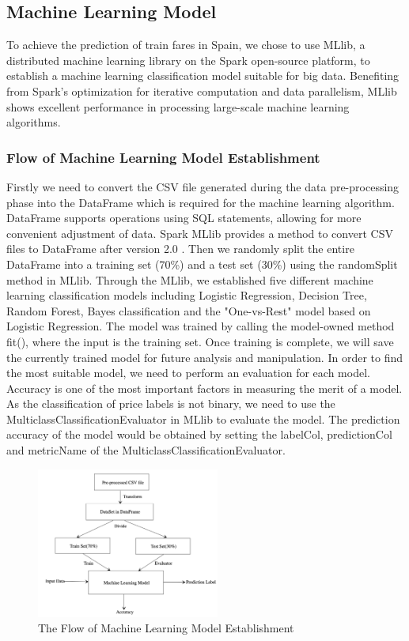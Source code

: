 \documentclass[conference]{IEEEtran}
\begin{document}
\subsection{Machine Learning Model}
To achieve the prediction of train fares in Spain, we chose to use MLlib, a distributed machine learning library on the Spark open-source platform, to establish a machine learning classification model suitable for big data. Benefiting from Spark's optimization for iterative computation and data parallelism, MLlib shows excellent performance in processing large-scale machine learning algorithms\cite{b25}. 
\subsubsection{Flow of Machine Learning Model Establishment}
Firstly we need to convert the CSV file generated during the data pre-processing phase into the DataFrame  which is required for the machine learning algorithm. DataFrame supports operations using SQL statements, allowing for more convenient adjustment of data. Spark MLlib provides a method to convert CSV files to DataFrame after version 2.0 \cite{b26}. Then we randomly split the entire DataFrame into a training set (70\%) and a test set (30\%) using the randomSplit method in MLlib. Through the MLlib, we established five different machine learning classification models including Logistic Regression, Decision Tree, Random Forest, Bayes classification and the "One-vs-Rest" model based on Logistic Regression. The model was trained by calling the model-owned method fit(), where the input is the training set. Once training is complete, we will save the currently trained model for future analysis and manipulation. In order to find the most suitable model, we need to perform an evaluation for each model. Accuracy is one of the most important factors in measuring the merit of a model. As the classification of price labels is not binary, we need to use the MulticlassClassificationEvaluator in MLlib to evaluate the model. The prediction accuracy of the model would be obtained by setting the labelCol, predictionCol and metricName of the MulticlassClassificationEvaluator.
\begin{figure}[ht]
\centering
\includegraphics[width=6cm]{02.png}
\caption{The Flow of Machine Learning Model Establishment}
\end{figure}
\end{document}
